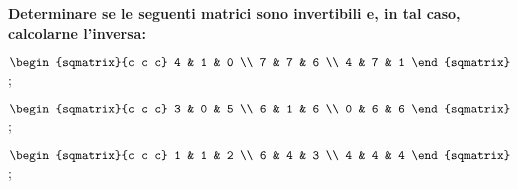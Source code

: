 \begin{exer}
    \textbf{Determinare se le seguenti matrici sono invertibili e, in tal caso, calcolarne l'inversa:}
    
    $
        \begin{sqmatrix}{c c c}
            4 & 1 & 0 \\
            7 & 7 & 6 \\
            4 & 7 & 1
        \end{sqmatrix}
    $;

    $
        \begin{sqmatrix}{c c c}
            3 & 0 & 5 \\
            6 & 1 & 6 \\
            0 & 6 & 6
        \end{sqmatrix}
    $;

    $
        \begin{sqmatrix}{c c c}
            1 & 1 & 2 \\
            6 & 4 & 3 \\
            4 & 4 & 4
        \end{sqmatrix}
    $;
\end{exer}
